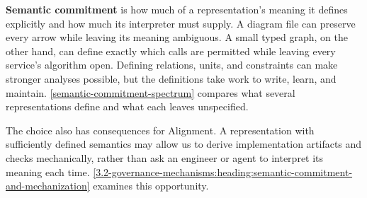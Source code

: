 
\textbf{Semantic commitment} is how much of a representation's meaning it defines explicitly and how much its interpreter must supply. A diagram file can preserve every arrow while leaving its meaning ambiguous. A small typed graph, on the other hand, can define exactly which calls are permitted while leaving every service's algorithm open. Defining relations, units, and constraints can make stronger analyses possible, but the definitions take work to write, learn, and maintain. \autoref{semantic-commitment-spectrum} compares what several representations define and what each leaves unspecified.

The choice also has consequences for Alignment. A representation with sufficiently defined semantics may allow us to derive implementation artifacts and checks mechanically, rather than ask an engineer or agent to interpret its meaning each time. \autoref{3.2-governance-mechanisms:heading:semantic-commitment-and-mechanization} examines this opportunity.



